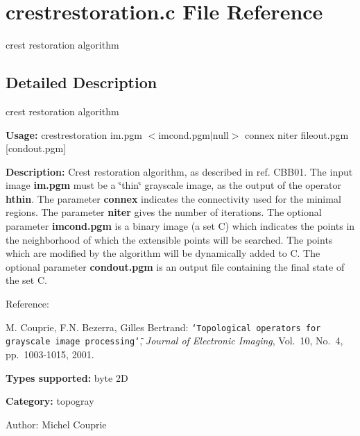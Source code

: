 \section{crestrestoration.c File Reference}
\label{crestrestoration_8c}
crest restoration algorithm 



\subsection{Detailed Description}
crest restoration algorithm 

{\bf Usage:} crestrestoration im.pgm $<$imcond.pgm$|$null$>$ connex niter fileout.pgm [condout.pgm]

{\bf Description:} Crest restoration algorithm, as described in ref. CBB01. The input image {\bf im.pgm} must be a \char`\"{}thin\char`\"{} grayscale image, as the output of the operator {\bf hthin}. The parameter {\bf connex} indicates the connectivity used for the minimal regions. The parameter {\bf niter} gives the number of iterations. The optional parameter {\bf imcond.pgm} is a binary image (a set C) which indicates the points in the neighborhood of which the extensible points will be searched. The points which are modified by the algorithm will be dynamically added to C. The optional parameter {\bf condout.pgm} is an output file containing the final state of the set C.

Reference:\par
 [CBB01] M. Couprie, F.N. Bezerra, Gilles Bertrand: {\tt \char`\"{}Topological operators for grayscale image processing\char`\"{}}, {\em  Journal of Electronic Imaging\/}, Vol.~10, No.~4, pp.~1003-1015, 2001.

{\bf Types supported:} byte 2D

{\bf Category:} topogray

\begin{Desc}
\item[Author:]Michel Couprie \end{Desc}
